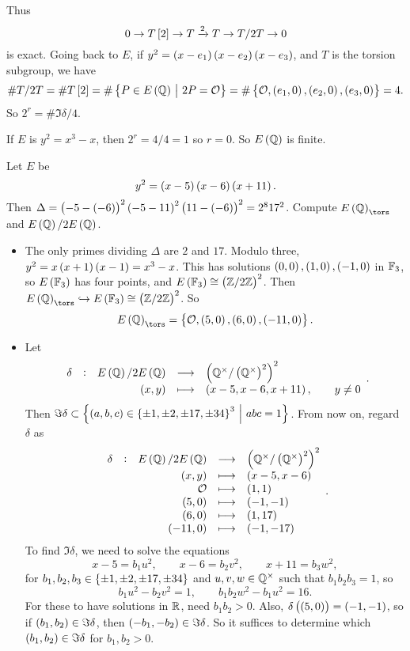 Thus
$$ 0 \to T\sbr{2} \to T \xrightarrow{2} T \to T / 2T \to 0 $$
is exact. Going back to $ E $, if $ y^2 = \br{x - e_1}\br{x - e_2}\br{x - e_3} $, and $ T $ is the torsion subgroup, we have
$$ \#T / 2T = \#T\sbr{2} = \#\cbr{P \in E\br{\QQ} \st 2P = \OOO} = \#\cbr{\OOO, \br{e_1, 0}, \br{e_2, 0}, \br{e_3, 0}} = 4. $$
So $ 2^r = \#\Im \delta / 4 $.

\begin{example*}
If $ E $ is $ y^2 = x^3 - x $, then $ 2^r = 4 / 4 = 1 $ so $ r = 0 $. So $ E\br{\QQ} $ is finite.
\end{example*}


\begin{example}
Let $ E $ be
$$ y^2 = \br{x - 5}\br{x - 6}\br{x + 11}. $$
Then $ \Delta = \br{-5 - \br{-6}}^2\br{-5 - 11}^2\br{11 - \br{-6}}^2 = 2^817^2 $. Compute $ E\br{\QQ}_{\tors} $ and $ E\br{\QQ} / 2E\br{\QQ} $.
\begin{itemize}
\item  The only primes dividing $ \Delta $ are $ 2 $ and $ 17 $. Modulo three, $ y^2 = x\br{x + 1}\br{x - 1} = x^3 - x $. This has solutions $ \br{0, 0}, \br{1, 0}, \br{-1, 0} $ in $ \mathbb{F}_3 $, so $ E\br{\FF_3} $ has four points, and $ E\br{\FF_3} \cong \br{\ZZ / 2\ZZ}^2 $. Then $ E\br{\QQ}_{\tors} \hookrightarrow E\br{\FF_3} \cong \br{\ZZ / 2\ZZ}^2 $. So
$$ E\br{\QQ}_{\tors} = \cbr{\OOO, \br{5, 0}, \br{6, 0}, \br{-11, 0}}. $$
\item Let
$$ \function[\delta]{E\br{\QQ} / 2E\br{\QQ}}{\br{\QQ^\times / \br{\QQ^\times}^2}^2}{\br{x, y}}{\br{x - 5, x - 6, x + 11}, \qquad y \ne 0}. $$
Then $ \Im \delta \subset \cbr{\br{a, b, c} \in \cbr{\pm 1, \pm 2, \pm 17, \pm 34}^3 \st abc = 1} $. From now on, regard $ \delta $ as
$$
\begin{array}{ccrcl}
\delta & : & E\br{\QQ} / 2E\br{\QQ} & \longrightarrow & \br{\QQ^\times / \br{\QQ^\times}^2}^2 \\
& & \br{x, y} & \longmapsto & \br{x - 5, x - 6} \\
& & \OOO & \longmapsto & \br{1, 1} \\
& & \br{5, 0} & \longmapsto & \br{-1, -1} \\
& & \br{6, 0} & \longmapsto & \br{1, 17} \\
& & \br{-11, 0} & \longmapsto & \br{-1, -17}
\end{array}.
$$
To find $ \Im \delta $, we need to solve the equations
$$ x - 5 = b_1u^2, \qquad x - 6 = b_2v^2, \qquad x + 11 = b_3w^2, $$
for $ b_1, b_2, b_3 \in \cbr{\pm 1, \pm 2, \pm 17, \pm 34} $ and $ u, v, w \in \mathbb{Q}^\times $ such that $ b_1b_2b_3 = 1 $, so
$$ b_1u^2 - b_2v^2 = 1, \qquad b_1b_2w^2 - b_1u^2 = 16. $$
For these to have solutions in $ \mathbb{R} $, need $ b_1b_2 > 0 $. Also, $ \delta\br{\br{5, 0}} = \br{-1, -1} $, so if $ \br{b_1, b_2} \in \Im \delta $, then $ \br{-b_1, -b_2} \in \Im \delta $. So it suffices to determine which $ \br{b_1, b_2} \in \Im \delta $ for $ b_1, b_2 > 0 $.


\end{itemize}
\end{example}
